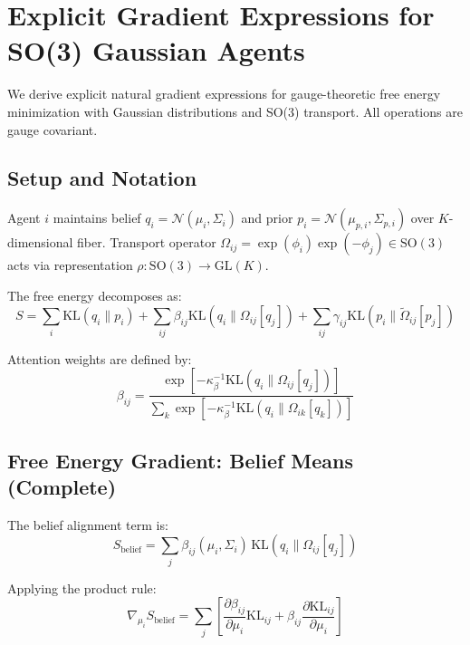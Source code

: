 \documentclass[11pt]{article}
\begin{document}
\section*{Explicit Gradient Expressions for SO(3) Gaussian Agents}

We derive explicit natural gradient expressions for gauge-theoretic free energy minimization with Gaussian distributions and SO(3) transport. All operations are gauge covariant.

\subsection*{Setup and Notation}

Agent $i$ maintains belief $q_i = \mathcal{N}(\mu_i, \Sigma_i)$ and prior $p_i = \mathcal{N}(\mu_{p,i}, \Sigma_{p,i})$ over $K$-dimensional fiber. Transport operator $\Omega_{ij} = \exp(\phi_i)\exp(-\phi_j) \in \mathrm{SO}(3)$ acts via representation $\rho: \mathrm{SO}(3) \to \mathrm{GL}(K)$.

The free energy decomposes as:
\begin{equation}
S = \sum_i \mathrm{KL}(q_i \| p_i) + \sum_{ij} \beta_{ij} \mathrm{KL}(q_i \| \Omega_{ij}[q_j]) + \sum_{ij} \gamma_{ij} \mathrm{KL}(p_i \| \tilde{\Omega}_{ij}[p_j])
\end{equation}

Attention weights are defined by:
\begin{equation}
\beta_{ij} = \frac{\exp\left[-\kappa_\beta^{-1}\mathrm{KL}(q_i \| \Omega_{ij}[q_j])\right]}{\sum_k \exp\left[-\kappa_\beta^{-1}\mathrm{KL}(q_i \| \Omega_{ik}[q_k])\right]}
\end{equation}

\subsection*{Free Energy Gradient: Belief Means (Complete)}

The belief alignment term is:
\begin{equation}
S_{\mathrm{belief}} = \sum_j \beta_{ij}(\mu_i, \Sigma_i) \, \mathrm{KL}(q_i \| \Omega_{ij}[q_j])
\end{equation}

Applying the product rule:
\begin{equation}
\nabla_{\mu_i} S_{\mathrm{belief}} = \sum_j \left[ \frac{\partial \beta_{ij}}{\partial \mu_i} \mathrm{KL}_{ij} + \beta_{ij} \frac{\partial \mathrm{KL}_{ij}}{\partial \mu_i} \right]
\end{equation}
\end{document}
